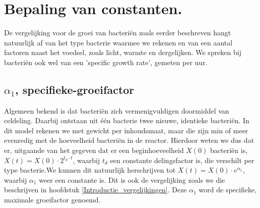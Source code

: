 
%
%

\chapter{Bepaling van constanten.}
\label{Bepaling van constanten}

De vergelijking voor de groei van bacteri\"en zoals eerder beschreven hangt natuurlijk af van het type bacterie waarmee we rekenen en van een aantal factoren naast het voedsel, zoals licht, warmte en dergelijken. We spreken bij bacteri\"en ook wel van een 'specific growth rate', gemeten per uur. 

\section{$\alpha_1$, specifieke-groeifactor}
Algemeen bekend is dat bacteri\"en zich vermenigvuldigen doormiddel van celdeling. Daarbij ontstaan uit \'e\'en bacterie twee nieuwe, identieke bacteri\"en. In dit model rekenen we met gewicht per inhoudsmaat, maar die zijn min of meer evenredig met de hoeveelheid bacteri\"en in de reactor. Hierdoor weten we dus dat er, uitgaande van het gegeven dat er een beginhoeveelheid $X(0)$ bacteri\"en is, $X(t) = X(0) \cdot 2^{t_d \cdot t}$, waarbij $t_d$ een constante delingsfactor is, die verschilt per type bacterie.We kunnen dit natuurlijk herschrijven tot $X(t) = X(0) \cdot e^{\alpha_1}$, waarbij $\alpha_1$ weer een constante is. Dit is ook de vergelijking zoals we die beschrijven in hoofdstuk \ref{Introductie_vergelijkingen}. Deze $\alpha_1$ word de specifieke, maximale groeifactor genoemd. 

